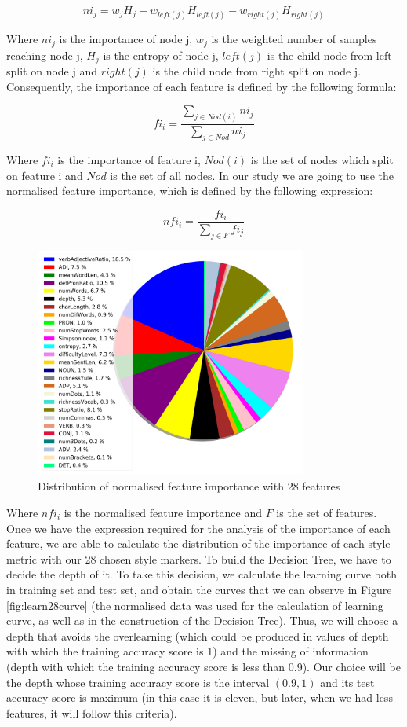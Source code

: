 $$
ni_j = w_jH_j - w_{left(j)}H_{left(j)} - w_{right(j)}H_{right(j)}
$$

Where $ni_j$ is the importance of node j, $w_j$ is the weighted number of samples reaching node j, $H_j$ is the entropy of node j, $left(j)$ is the child node from left split on node j and $right(j)$ is the child node from right split on node j. Consequently, the importance of each feature is defined by the following formula:

$$
fi_i = \frac{\sum_{j\in Nod(i)}ni_j}{\sum_{j\in Nod}ni_j}
$$

Where $fi_i$ is the importance of feature i, $Nod(i)$ is the set of nodes which split on feature i and $Nod$ is the set of all nodes. In our study we are going to use the normalised feature importance, which is defined by the following expression:

$$
nfi_i=\frac{fi_i}{\sum_{j\in F}fi_j}
$$

\begin{figure}[t]
	\centering%
	\centerline{\includegraphics[width=0.8\textwidth]{Imagenes/Bitmap/DecisionTrees/pie28.png}}%
	\caption{Distribution of normalised feature importance with 28 features}%
	\label{fig:nfi28}
\end{figure}

Where $nfi_i$ is the normalised feature importance and $F$ is the set of features. Once we have the expression required for the analysis of the importance of each feature, we are able to calculate the distribution of the importance of each style metric with our 28 chosen style markers. To build the Decision Tree, we have to decide the depth of it. To take this decision, we calculate the learning curve both in training set and test set, and obtain the curves that we can observe in Figure \ref{fig:learn28curve} (the normalised data was used for the calculation of learning curve, as well as in the construction of the Decision Tree). Thus, we will choose a depth that avoids the overlearning (which could be produced in values of depth with which the training accuracy score is 1) and the missing of information (depth with which the training accuracy score is less than 0.9). Our choice will be the depth whose training accuracy score is the interval $(0.9, 1)$ and its test accuracy score is maximum (in this case it is eleven, but later, when we had less features, it will follow this criteria).

